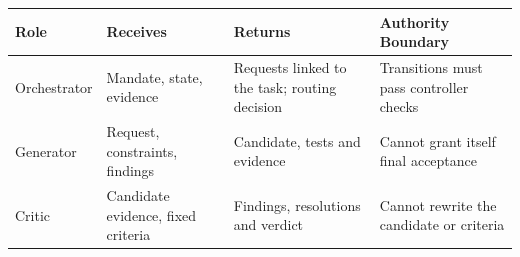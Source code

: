 \begin{tabular}{@{}P{2.0cm}P{3.3cm}P{3.5cm}P{3.7cm}@{}}
\toprule
\textbf{Role} & \textbf{Receives} & \textbf{Returns} & \textbf{Authority Boundary} \\
\midrule
Orchestrator & Mandate, state, evidence & Requests linked to the task; routing decision & Transitions must pass controller checks \\
Generator & Request, constraints, findings & Candidate, tests and evidence & Cannot grant itself final acceptance \\
Critic & Candidate evidence, fixed criteria & Findings, resolutions and verdict & Cannot rewrite the candidate or criteria \\
\bottomrule
\end{tabular}
